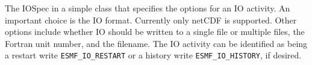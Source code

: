 
The IOSpec in a simple class that specifies the options for 
an IO activity.  An important choice is the IO format.  Currently
only netCDF is supported.  Other options include 
whether IO should be written to a single file or multiple files, 
the Fortran unit number, and the filename.  The IO activity can
be identified as being a restart write {\tt ESMF\_IO\_RESTART} or 
a history write {\tt ESMF\_IO\_HISTORY}, if desired.



